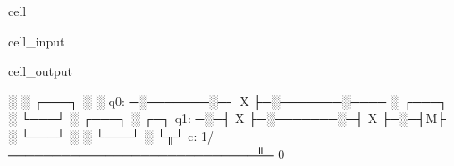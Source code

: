 \documentclass[letterpaper,10pt,english]{jupyterBook}
\begin{document}
\begin{sphinxuseclass}{cell}
\begin{sphinxVerbatimInput}
\begin{sphinxuseclass}{cell_input}
\begin{sphinxVerbatim}[commandchars=\\\{\}]
     
        \PYG{p}{[}\PYG{p}{[}\PYG{p}{]}\PYG{p}{[}\PYG{p}{]}\PYG{p}{]}
          
     
        \PYG{p}{[}\PYG{p}{]}
          
     
        \PYG{p}{[}\PYG{p}{]}
        \PYG{p}{[}\PYG{p}{]}\PYG{p}{[}\PYG{p}{]}
        \PYG{p}{[}\PYG{p}{]}
          
     
        \PYG{p}{[}\PYG{p}{]}
          

    \PYG{p}{[}\PYG{p}{[}\PYG{p}{]}\PYG{p}{[}\PYG{p}{]}\PYG{p}{]}



\PYG{p}{[}\PYG{p}{]}
\PYG{p}{[}\PYG{p}{]}\PYG{p}{[}\PYG{p}{]}
\end{sphinxVerbatim}

\end{sphinxuseclass}\end{sphinxVerbatimInput}
\begin{sphinxVerbatimOutput}

\begin{sphinxuseclass}{cell_output}
\begin{sphinxVerbatim}[commandchars=\\\{\}]
      ░       ░ ┌───┐ ░       ░
q\PYGZus{}0: ─░───────░─┤ X ├─░───────░────
      ░ ┌───┐ ░ └───┘ ░ ┌───┐ ░ ┌─┐
q\PYGZus{}1: ─░─┤ X ├─░───────░─┤ X ├─░─┤M├
      ░ └───┘ ░       ░ └───┘ ░ └╥┘
c: 1/════════════════════════════╩═
                                 0
\end{sphinxVerbatim}


\end{sphinxuseclass}
\end{sphinxVerbatimOutput}
\end{sphinxuseclass}
\end{document}
